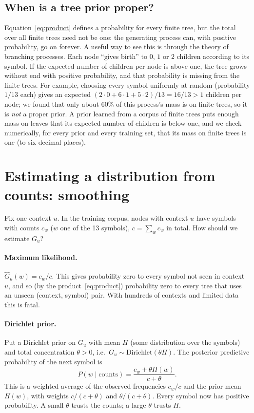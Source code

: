\documentclass[11pt]{article}
\begin{document}
\subsection{When is a tree prior proper?}\label{sec:proper}

Equation~\eqref{eq:product} defines a probability for every finite tree, but the total over all finite
trees need not be one: the generating process can, with positive probability, go on forever. A useful
way to see this is through the theory of branching processes. Each node ``gives birth'' to $0$, $1$ or
$2$ children according to its symbol. If the expected number of children per node is above one, the
tree grows without end with positive probability, and that probability is missing from the finite
trees. For example, choosing every symbol uniformly at random (probability $1/13$ each) gives an
expected $(2\cdot 0 + 6\cdot 1 + 5\cdot 2)/13 = 16/13 > 1$ children per node; we found that only about
60\% of this process's mass is on finite trees, so it is \emph{not} a proper prior. A prior learned from
a corpus of finite trees puts enough mass on leaves that its expected number of children is below one,
and we check numerically, for every prior and every training set, that its mass on finite trees is one
(to six decimal places).

\section{Estimating a distribution from counts: smoothing}\label{sec:smoothing}

Fix one context $u$. In the training corpus, nodes with context $u$ have symbols with counts
$c_{w}$ ($w$ one of the 13 symbols), $c = \sum_w c_w$ in total. How should we estimate $G_u$?

\paragraph{Maximum likelihood.} $\hat G_u(w) = c_w/c$. This gives probability zero to every symbol not
seen in context $u$, and so (by the product~\eqref{eq:product}) probability zero to every tree that
uses an unseen (context, symbol) pair. With hundreds of contexts and limited data this is fatal.

\paragraph{Dirichlet prior.} Put a Dirichlet prior on $G_u$ with mean $H$ (some distribution over the
symbols) and total concentration $\theta>0$, i.e.\ $G_u \sim \mathrm{Dirichlet}(\theta H)$. The
posterior predictive probability of the next symbol is
\begin{equation}\label{eq:dirichlet}
  P(w \mid \text{counts}) = \frac{c_w + \theta H(w)}{c + \theta}.
\end{equation}
This is a weighted average of the observed frequencies $c_w/c$ and the prior mean $H(w)$, with weights
$c/(c+\theta)$ and $\theta/(c+\theta)$. Every symbol now has positive probability. A small $\theta$ trusts
the counts; a large $\theta$ trusts $H$.
\end{document}
